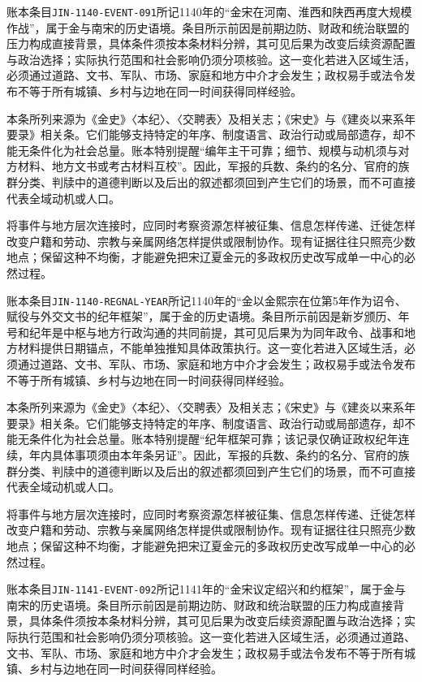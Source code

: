 账本条目\texttt{JIN-1140-EVENT-091}所记1140年的“金宋在河南、淮西和陕西再度大规模作战”，属于金与南宋的历史语境。条目所示前因是前期边防、财政和统治联盟的压力构成直接背景，具体条件须按本条材料分辨，其可见后果为改变后续资源配置与政治选择；实际执行范围和社会影响仍须分项核验。这一变化若进入区域生活，必须通过道路、文书、军队、市场、家庭和地方中介才会发生；政权易手或法令发布不等于所有城镇、乡村与边地在同一时间获得同样经验。

本条所列来源为《金史》〈本纪〉、〈交聘表〉及相关志；《宋史》与《建炎以来系年要录》相关条。它们能够支持特定的年序、制度语言、政治行动或局部遗存，却不能无条件化为社会总量。账本特别提醒“编年主干可靠；细节、规模与动机须与对方材料、地方文书或考古材料互校”。因此，军报的兵数、条约的名分、官府的族群分类、判牍中的道德判断以及后出的叙述都须回到产生它们的场景，而不可直接代表全域动机或人口。

将事件与地方层次连接时，应同时考察资源怎样被征集、信息怎样传递、迁徙怎样改变户籍和劳动、宗教与亲属网络怎样提供或限制协作。现有证据往往只照亮少数地点；保留这种不均衡，才能避免把宋辽夏金元的多政权历史改写成单一中心的必然过程。

账本条目\texttt{JIN-1140-REGNAL-YEAR}所记1140年的“金以金熙宗在位第5年作为诏令、赋役与外交文书的纪年框架”，属于金的历史语境。条目所示前因是新岁颁历、年号和纪年是中枢与地方行政沟通的共同前提，其可见后果为为同年政令、战事和地方材料提供日期锚点，不能单独推知具体政策执行。这一变化若进入区域生活，必须通过道路、文书、军队、市场、家庭和地方中介才会发生；政权易手或法令发布不等于所有城镇、乡村与边地在同一时间获得同样经验。

本条所列来源为《金史》〈本纪〉、〈交聘表〉及相关志；《宋史》与《建炎以来系年要录》相关条。它们能够支持特定的年序、制度语言、政治行动或局部遗存，却不能无条件化为社会总量。账本特别提醒“纪年框架可靠；该记录仅确证政权纪年连续，年内具体事项须由本年条另证”。因此，军报的兵数、条约的名分、官府的族群分类、判牍中的道德判断以及后出的叙述都须回到产生它们的场景，而不可直接代表全域动机或人口。

将事件与地方层次连接时，应同时考察资源怎样被征集、信息怎样传递、迁徙怎样改变户籍和劳动、宗教与亲属网络怎样提供或限制协作。现有证据往往只照亮少数地点；保留这种不均衡，才能避免把宋辽夏金元的多政权历史改写成单一中心的必然过程。

账本条目\texttt{JIN-1141-EVENT-092}所记1141年的“金宋议定绍兴和约框架”，属于金与南宋的历史语境。条目所示前因是前期边防、财政和统治联盟的压力构成直接背景，具体条件须按本条材料分辨，其可见后果为改变后续资源配置与政治选择；实际执行范围和社会影响仍须分项核验。这一变化若进入区域生活，必须通过道路、文书、军队、市场、家庭和地方中介才会发生；政权易手或法令发布不等于所有城镇、乡村与边地在同一时间获得同样经验。

